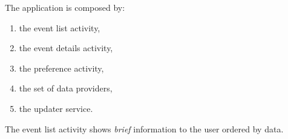\documentclass[10pt, twoside]{article}
\begin{document}
The application is composed by:
\begin{enumerate}
	\item	the event list activity,
	\item	the event details activity,
	\item	the preference activity,
	\item	the set of data providers,
	\item	the updater service.
\end{enumerate}

The event list activity shows \emph{brief} information to the user ordered by data.
\end{document}
